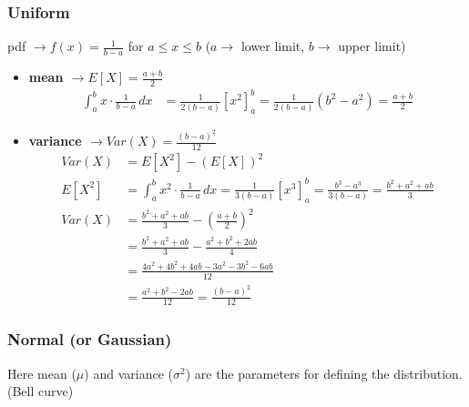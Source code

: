 \subsubsection{Uniform}
pdf $\rightarrow f(x) = \frac{1}{b-a}$ for $a \leq x \leq b$ ($a \rightarrow$ lower limit, $b \rightarrow$ upper limit)
\begin{itemize}
    \item \textbf{mean $\rightarrow E[X] = \frac{a+b}{2}$}
    \begin{align*}
        \int_a^b x \cdot \frac{1}{b-a} \, dx &= \frac{1}{2(b-a)} [x^2]_a^b = \frac{1}{2(b-a)} (b^2 - a^2) = \frac{a+b}{2}
    \end{align*}
    \item \textbf{variance $\rightarrow Var(X) = \frac{(b-a)^2}{12}$}
    \begin{align*}
        Var(X) &= E[X^2] - (E[X])^2 \\
        E[X^2] &= \int_a^b x^2 \cdot \frac{1}{b-a} \, dx = \frac{1}{3(b-a)} [x^3]_a^b = \frac{b^3 - a^3}{3(b-a)} = \frac{b^2 + a^2 + ab}{3} \\
        Var(X) &= \frac{b^2 + a^2 + ab}{3} - \left(\frac{a+b}{2}\right)^2 \\
        &= \frac{b^2 + a^2 + ab}{3} - \frac{a^2 + b^2 + 2ab}{4} \\
        &= \frac{4a^2 + 4b^2 + 4ab - 3a^2 - 3b^2 - 6ab}{12} \\
        &= \frac{a^2 + b^2 - 2ab}{12} = \frac{(b-a)^2}{12}
    \end{align*}
\end{itemize}

\subsubsection{Normal (or Gaussian)}
Here mean ($\mu$) and variance ($\sigma^2$) are the parameters for defining the distribution. (Bell curve)

